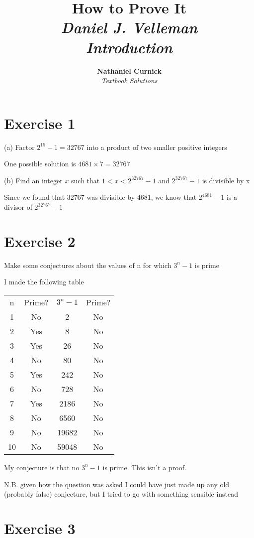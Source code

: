 \documentclass[11pt]{article}
\title{\textbf{How to Prove It} \\ {\Large\itshape Daniel J. Velleman} \\ {\Large\itshape Introduction}}
\author{\textbf{Nathaniel Curnick} \\ \textit{Textbook Solutions}}
\date{}
\begin{document}
\maketitle

\section*{Exercise 1}
\noindent (a) Factor $2^{15} - 1 = 32767$ into a product of two smaller positive integers

One possible solution is $4681 \times 7 = 32767$

\noindent (b) Find an integer $x$ such that $1 < x < 2^{32767} - 1$ and $2^{32767} - 1$ is divisible by x

Since we found that $32767$ was divisible by $4681$, we know that $2^{4681} - 1$ is a divisor of $2^{32767} - 1$

\section*{Exercise 2}

\noindent Make some conjectures about the values of n for which $3^n -1$ is prime

I made the following table 
\begin{center}
    \begin{tabular}{ c c c c }
     n & Prime? & $3^n - 1$ & Prime?\\ 
     1 & No & 2 & No \\  
     2 & Yes & 8 & No \\
     3 & Yes & 26 & No\\
     4 & No & 80 & No\\
     5 & Yes & 242 & No \\
     6 & No & 728 & No \\
     7 & Yes & 2186 & No \\
     8 & No & 6560 & No \\
     9 & No & 19682 & No \\
     10 & No & 59048 & No    
    \end{tabular}
    \end{center}

My conjecture is that no $3^n - 1$ is prime. This isn't a proof.

N.B. given how the question was asked I could have just made up any old (probably false) conjecture, but I tried to go with something sensible instead

\section*{Exercise 3}
\end{document}

